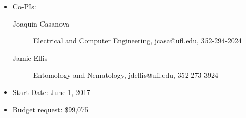 
\begin{itemize}
\item Co-PIs:
\begin{description}
\item[Joaquin Casanova] Electrical and Computer Engineering, jcasa@ufl.edu, 352-294-2024
\item[Jamie Ellis] Entomology and Nematology, jdellis@ufl.edu, 352-273-3924
\end{description}
\item Start Date: June 1, 2017
\item Budget request: \$99,075
\end{itemize}
